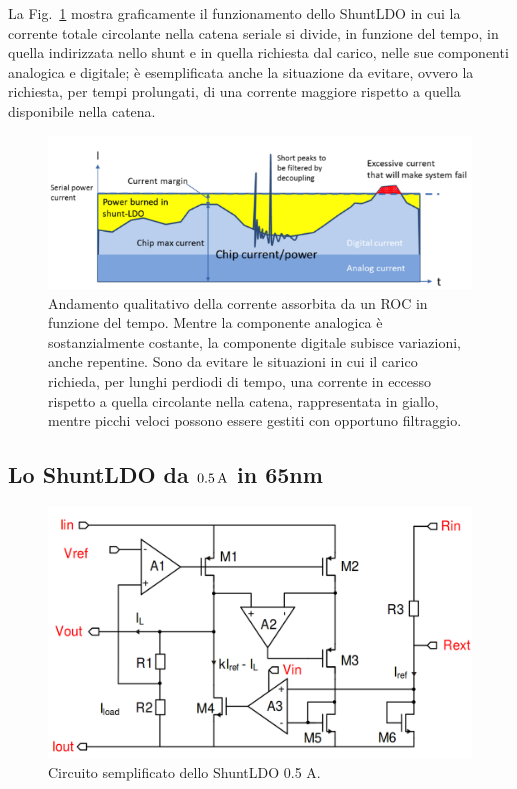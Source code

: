 La Fig.~\ref{SLDOprinciple} mostra graficamente il funzionamento dello ShuntLDO in cui la corrente totale circolante nella catena seriale si divide, in funzione del tempo, in quella indirizzata nello shunt e in quella richiesta dal carico, nelle sue componenti analogica e digitale; \`e esemplificata anche la situazione da evitare, ovvero la richiesta, per tempi prolungati, di una corrente maggiore rispetto a quella disponibile nella catena.
\begin{figure}[!htbp]
\centering
\includegraphics[scale=.5]{Immagini/ShuntRegulatorPrinciple}
\caption{Andamento qualitativo della corrente assorbita da un ROC in funzione del tempo. Mentre la componente analogica \`e sostanzialmente costante, la componente digitale subisce variazioni, anche repentine. Sono da evitare le situazioni in cui il carico richieda, per lunghi perdiodi di tempo, una corrente in eccesso rispetto a quella circolante nella catena, rappresentata in giallo, mentre picchi veloci possono essere gestiti con opportuno filtraggio.}
\label{SLDOprinciple}
\end{figure}

\subsection{Lo ShuntLDO da $0.5\rm \, A$ in 65nm}

 
\begin{figure}[!htbp]
\centering
\includegraphics[scale=.3]{Immagini/SLDO5A}
\caption{Circuito semplificato dello ShuntLDO 0.5 A.}
\label{SLDO5A}
\end{figure}


